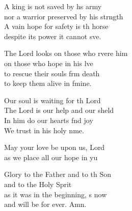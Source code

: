 \begin{psalmverse}
\begin{patverse}
A king is not saved by h\pointup{\i}s army\Med\\
    nor a warrior preserved by his strngth\\
A vain hope for safety is th horse\Med\\
    despite its power it cannot sve.

The Lord looks on those who rvere him\Med\\
    on those who hope in his lve\\
to rescue their souls frm death\Med\\
    to keep them alive in fmine.

Our soul is waiting for th Lord\Med\\
    The Lord is our help and our sh\pointup{\i}eld\\
In him do our hearts f\pointup{\i}nd joy\Med\\
    We trust in his holy nme.

May your love be upon us,  Lord\Med\\
    as we place all our hope in yu

Glory to the Father and to th Son\Med\\
    and to the Holy Sp\pointup{\i}rit\\
as it was in the beginning, \pointup{\i}s now\Med\\
    and will be for ever. Amn.
  \end{patverse}
\end{psalmverse}
